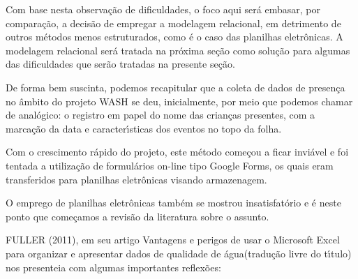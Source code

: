 \documentclass[
12pt,		%
openright,	%
twoside,  %
a4paper,			%
chapter=TITLE,		%
english,			%
french,				%
spanish,			%
brazil				%
]{USPSC-classe/USPSC}
\begin{document}
Com base nesta observa\c{c}\~ao de dificuldades, o foco aqui ser\'a embasar, por compara\c{c}\~ao, a decis\~ao de empregar a modelagem relacional, em detrimento de outros m\'etodos menos estruturados, como \'e o caso das planilhas eletr\^onicas. A modelagem relacional ser\'a tratada na pr\'oxima se\c{c}\~ao como solu\c{c}\~ao para algumas das dificuldades que ser\~ao tratadas na presente se\c{c}\~ao.










De forma bem suscinta, podemos recapitular que a coleta de dados de presen\c{c}a no \^ambito do projeto WASH se deu, inicialmente, por meio que podemos chamar de anal\'ogico: o registro em papel do nome das crian\c{c}as presentes, com a marca\c{c}\~ao da data e caracter\'{\i}sticas dos eventos no topo da folha.










Com o crescimento r\'apido do projeto, este m\'etodo come\c{c}ou a ficar invi\'avel e foi tentada a utiliza\c{c}\~ao de formul\'arios on-line tipo \textquotedbl Google Forms\textquotedbl , os quais eram transferidos para planilhas eletr\^onicas visando armazenagem.










O emprego de planilhas eletr\^onicas tamb\'em se mostrou insatisfat\'orio e \'e neste ponto que come\c{c}amos a revis\~ao da literatura sobre o assunto.










FULLER (2011), em seu artigo \textquotedbl Vantagens e perigos de usar o Microsoft Excel para organizar e apresentar dados de qualidade de \'agua\textquotedbl  (tradu\c{c}\~ao livre do t\'{\i}tulo) nos presenteia com algumas importantes reflex\~oes:











\noindent\begin{center}\mbox{\centering{}}\end{center}
\end{document}
